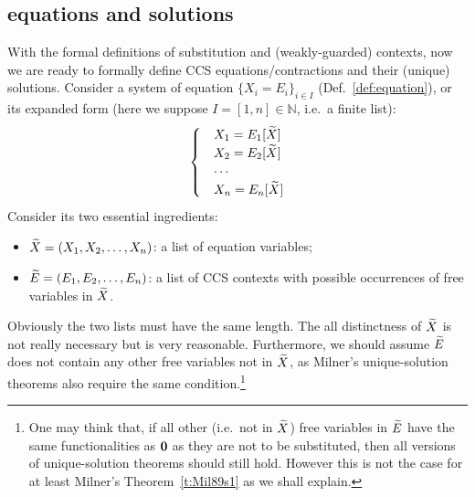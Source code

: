 \subsection{\Multivariate equations and solutions}

With the formal definitions of \multivariate substitution and
\multivariate (weakly-guarded) contexts, now we are ready to formally
define \multivariate CCS equations/contractions and their (unique)
solutions. Consider a system of equation $\{X_i = E_i\}_{i\in I}$
(Def.~\ref{def:equation}), or its expanded form (here we suppose $I = [1,n]
\in \mathbb{N}$, i.e.~a finite list):
\begin{equation*}
  \begin{cases}
    &X_1 = E_1[\widetilde X] \\
    &X_2 = E_2[\widetilde X] \\
    & \cdots \\
    &X_n = E_n[\widetilde X]
  \end{cases}
\end{equation*}
Consider its two essential ingredients:
\begin{itemize}
\item $\widetilde X = (X_1, X_2, \ldots, X_n)$: a list of equation variables;
\item $\widetilde E = (E_1, E_2, \ldots, E_n)$: a list of CCS contexts 
  with possible occurrences of free variables in $\widetilde X$.
\end{itemize}
Obviously the two lists must have the same length. The all
distinctness of $\widetilde X$ is not really necessary but is very
reasonable. Furthermore, we should assume $\widetilde E$ does not contain
any other free variables not in $\widetilde X$, as Milner's unique-solution
theorems also require the same condition.\footnote{One may think that,
  if all other (i.e.~not in $\widetilde X$) free variables in $\widetilde E$ have
  the same functionalities as ${\boldsymbol 0}$ as they are not to be
  substituted, then all versions of unique-solution
  theorems should still hold. However this is not the case for at
  least Milner's Theorem~\ref{t:Mil89s1} as we shall explain.}

